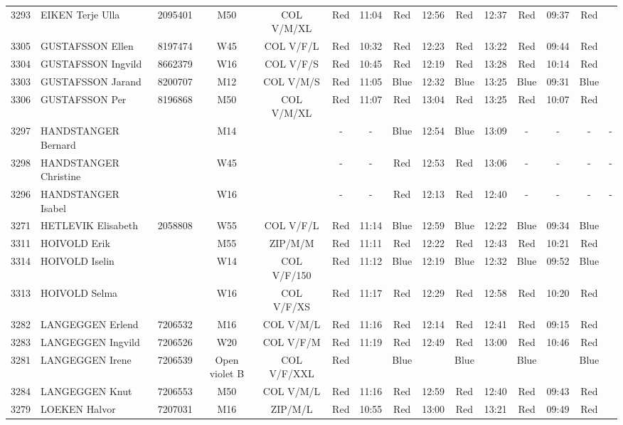 \documentclass{report}
\begin{document}
\begin{longtable}{|c|l|r|c|c|*{5}{cc|}}
    3293 & EIKEN Terje Ulla & 2095401 & M50 & COL V/M/XL & Red & 11:04 & Red & 12:56 & Red & 12:37 & Red & 09:37 & Red &  \\
    3305 & GUSTAFSSON Ellen & 8197474 & W45 & COL V/F/L & Red & 10:32 & Red & 12:23 & Red & 13:22 & Red & 09:44 & Red &  \\
    3304 & GUSTAFSSON Ingvild & 8662379 & W16 & COL V/F/S & Red & 10:45 & Red & 12:19 & Red & 13:28 & Red & 10:14 & Red &  \\
    3303 & GUSTAFSSON Jarand & 8200707 & M12 & COL V/M/S & Red & 11:05 & Blue & 12:32 & Blue & 13:25 & Blue & 09:31 & Blue &  \\
    3306 & GUSTAFSSON Per & 8196868 & M50 & COL V/M/XL & Red & 11:07 & Red & 13:04 & Red & 13:25 & Red & 10:07 & Red &  \\
    3297 & HANDSTANGER Bernard &  & M14 &   & - &  - & Blue & 12:54 & Blue & 13:09 & - &  - & - &  -\\
    3298 & HANDSTANGER Christine &  & W45 &   & - &  - & Red & 12:53 & Red & 13:06 & - &  - & - &  -\\
    3296 & HANDSTANGER Isabel &  & W16 &   & - &  - & Red & 12:13 & Red & 12:40 & - &  - & - &  -\\
    3271 & HETLEVIK Elisabeth & 2058808 & W55 & COL V/F/L & Red & 11:14 & Blue & 12:59 & Blue & 12:22 & Blue & 09:34 & Blue &  \\
    3311 & HOIVOLD Erik &  & M55 & ZIP/M/M & Red & 11:11 & Red & 12:22 & Red & 12:43 & Red & 10:21 & Red &  \\
    3314 & HOIVOLD Iselin &  & W14 & COL V/F/150 & Red & 11:12 & Blue & 12:19 & Blue & 12:32 & Blue & 09:52 & Blue &  \\
    3313 & HOIVOLD Selma &  & W16 & COL V/F/XS & Red & 11:17 & Red & 12:29 & Red & 12:58 & Red & 10:20 & Red &  \\
    3282 & LANGEGGEN Erlend & 7206532 & M16 & COL V/M/L & Red & 11:16 & Red & 12:14 & Red & 12:41 & Red & 09:15 & Red &  \\
    3283 & LANGEGGEN Ingvild & 7206526 & W20 & COL V/F/M & Red & 11:19 & Red & 12:49 & Red & 13:00 & Red & 10:46 & Red &  \\
    3281 & LANGEGGEN Irene & 7206539 & Open violet B & COL V/F/XXL & Red &   & Blue &   & Blue &   & Blue &   & Blue &  \\
    3284 & LANGEGGEN Knut & 7206553 & M50 & COL V/M/L & Red & 11:16 & Red & 12:59 & Red & 12:40 & Red & 09:43 & Red &  \\
    3279 & LOEKEN Halvor & 7207031 & M16 & ZIP/M/L & Red & 10:55 & Red & 13:00 & Red & 13:21 & Red & 09:49 & Red &  \\

\end{longtable}
\end{document}
